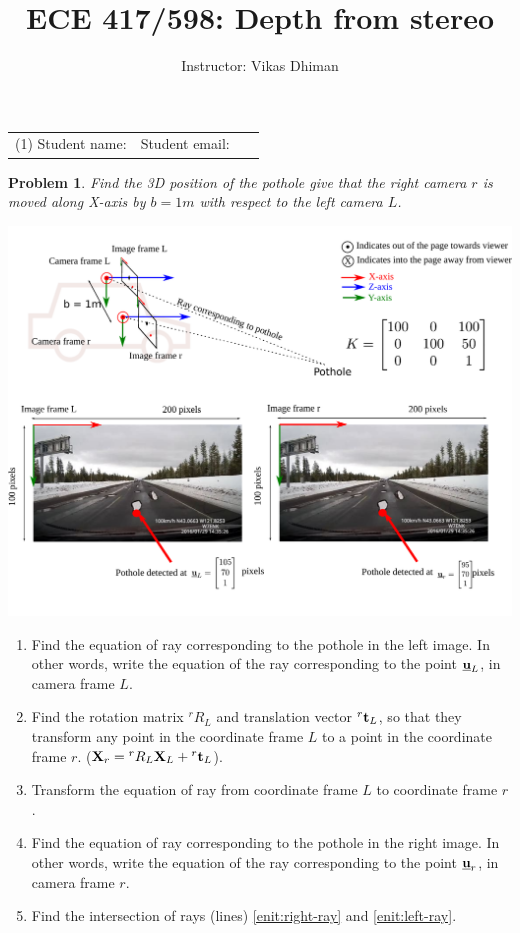 \documentclass[times,singlecolumn]{article}
\title{ECE 417/598: Depth from stereo}
\author{Instructor: Vikas Dhiman}
\newcommand{\ubfu}{\underline{\bfu}}
\newtheorem{prob}{Problem}
\begin{document}
\maketitle
\begin{tabular}{p{0.5\linewidth}p{0.5\linewidth}}
  (1) Student name:& Student email: \\
\end{tabular}

\begin{prob}
  Find the 3D position of the pothole give that the right camera $r$  is moved
  along X-axis by $b=1m$ with respect to the left camera $L$. 
\end{prob}

\includegraphics[width=\linewidth]{media/image-road-triangulation-ray-ray.pdf}

\newpage
\begin{enumerate}
\item Find the equation of ray corresponding to the pothole in the left image.
  In other words, write the equation of the ray corresponding to the point
  $\ubfu_L$, in camera frame $L$.
  \vspace{10em}

\item Find the rotation matrix ${}^rR_L$ and translation vector ${}^r\mathbf{t}_L$, so
  that they transform any point in the coordinate frame $L$ to a point in the
  coordinate frame $r$. ($\mathbf{X}_r = {}^rR_L \mathbf{X}_L + {}^r\mathbf{t}_L$).
  \vspace{10em}

\item Transform the equation of ray from coordinate frame $L$ to coordinate
  frame $r$.
  \label{enit:left-ray}
  \vspace{10em}

\item Find the equation of ray corresponding to the pothole in the right image.
  In other words, write the equation of the ray corresponding to the point
  $\ubfu_r$, in camera frame $r$.
  \label{enit:right-ray}
  \vspace{10em}

\item Find the intersection of rays (lines) \ref{enit:right-ray} and \ref{enit:left-ray}.
\end{enumerate}
\end{document}
